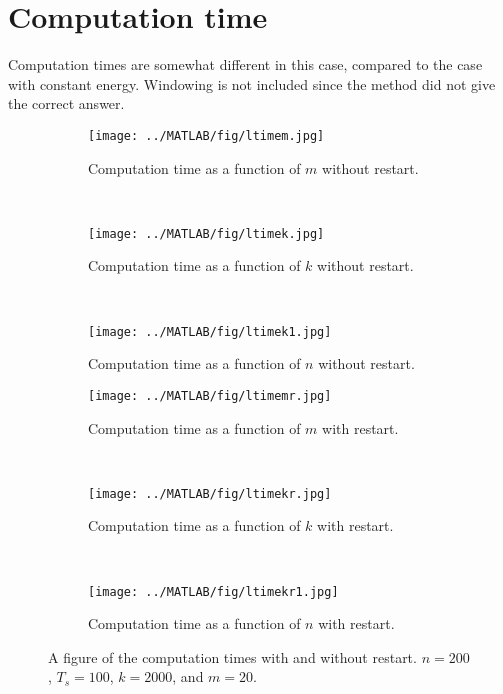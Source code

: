 \section{Computation time} %
\label{sec:vruntime}
Computation times are somewhat different in this case, compared to the case with constant energy. Windowing is not included since the method did not give the correct answer.
\begin{figure}[H]
        \centering
        \begin{subfigure}[b]{0.3\textwidth}
                \texttt{[image: ../MATLAB/fig/ltimem.jpg]}
                \caption{ Computation time as a function of $m$ without restart. }
                \label{fig:ltimem}
        \end{subfigure}
        ~
        \begin{subfigure}[b]{0.3\textwidth}
                \texttt{[image: ../MATLAB/fig/ltimek.jpg]}
                \caption{ Computation time as a function of $k$ without restart. }
                \label{fig:ltimek}
        \end{subfigure}
        ~
        \begin{subfigure}[b]{0.3\textwidth}
                \texttt{[image: ../MATLAB/fig/ltimek1.jpg]}
                \caption{ Computation time as a function of $n$ without restart. }
                \label{fig:ltimek1}
        \end{subfigure}
        
                \begin{subfigure}[b]{0.3\textwidth}
                \texttt{[image: ../MATLAB/fig/ltimemr.jpg]}
                \caption{ Computation time as a function of $m$ with restart. }
                \label{fig:ltimemr}
        \end{subfigure}
        ~
        \begin{subfigure}[b]{0.3\textwidth}
                \texttt{[image: ../MATLAB/fig/ltimekr.jpg]}
                \caption{ Computation time as a function of $k$ with restart. }
                \label{fig:ltimekr}
        \end{subfigure}
        ~
        \begin{subfigure}[b]{0.3\textwidth}
                \texttt{[image: ../MATLAB/fig/ltimekr1.jpg]}
                \caption{ Computation time as a function of $n$ with restart. }
                \label{fig:ltimekr1}
        \end{subfigure}
        \caption{ A figure of the computation times with and without restart. $n = 200$, $T_s = 100$, $k = 2000$, and $m = 20$. }
        \label{fig:ltime0}
\end{figure}

